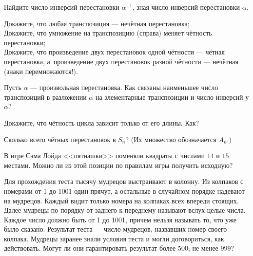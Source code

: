 \documentclass[a4paper,12pt]{article}
\begin{document}
Найдите число инверсий перестановки $\alpha^{-1}$, зная число инверсий перестановки $\alpha$.

 Докажите, что любая транспозиция --- нечётная перестановка;\\
 Докажите, что умножение на транспозицию (справа) меняет чётность перестановки;\\
 Докажите, что произведение двух перестановок одной чётности ---
чётная перестановка, а~произведение двух перестановок разной
чётности --- нечётная (знаки перемножаются!).

Пусть $\alpha$ --- произвольная перестановка. Как связаны наименьшее число транспозиций в разложении $\alpha$ на элементарные транспозиции и число инверсий у $\alpha$?

Докажите, что чётность цикла зависит только от его длины. Как?


Сколько всего чётных перестановок в $S_n$? (Их множество обозначается $A_n$.)



В игре Сэма Лойда <<пятнашки>> поменяли квадраты с числами $14$ и $15$ местами. Можно ли из этой позиции по правилам игры получить исходную?

Для прохождения теста тысячу мудрецов выстраивают в колонну. Из колпаков с  номерами от 1 до 1001 один прячут, а остальные в случайном порядке надевают на мудрецов. Каждый видит только номера на колпаках всех впереди стоящих. Далее мудрецы по порядку от заднего к переднему называют вслух целые числа. Каждое число должно быть от 1 до 1001, причем нельзя называть то, что уже было сказано. Результат теста --- число мудрецов, назвавших номер своего колпака.  Мудрецы заранее знали условия теста и могли договориться, как действовать. Могут ли они гарантировать результат
  более 500;
 не менее 999?



%
\end{document}
